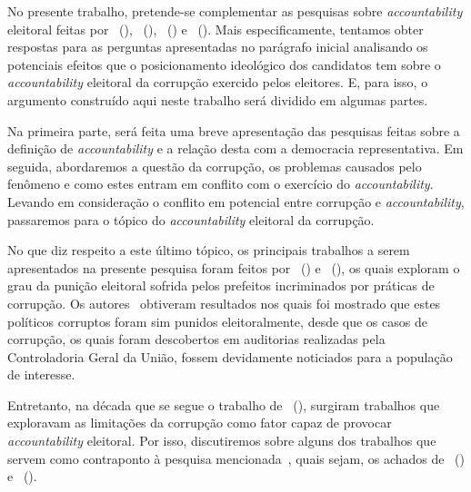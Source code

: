 \documentclass[
	12pt,				%
	openright,			%
	twoside,			%
	a4paper,			%
	openany,
	english,			%
	brazil				%
	]{abntex2}
\begin{document}
No presente trabalho, pretende-se complementar as pesquisas sobre \textit{accountability} eleitoral feitas por ~(\citeyear{ferraz2008exposing}), ~(\citeyear{Avis2018Oct}), ~(\citeyear{Boas2019Apr}) e ~(\citeyear{Botero2021Apr}). Mais especificamente, tentamos obter respostas para as perguntas apresentadas no parágrafo inicial analisando os potenciais efeitos que o posicionamento ideológico dos candidatos tem sobre o \textit{accountability} eleitoral da corrupção exercido pelos eleitores. E, para isso, o argumento construído aqui neste trabalho será dividido em algumas partes.

Na primeira parte, será feita uma breve apresentação das pesquisas feitas sobre a definição de \textit{accountability} e a relação desta com a democracia representativa. Em seguida, abordaremos a questão da corrupção, os problemas causados pelo fenômeno e como estes entram em conflito com o exercício do \textit{accountability}. Levando em consideração o conflito em potencial entre corrupção e \textit{accountability}, passaremos para o tópico do \textit{accountability} eleitoral da corrupção.

No que diz respeito a este último tópico, os principais trabalhos a serem apresentados na presente pesquisa foram feitos por ~(\citeyear{ferraz2008exposing}) e ~(\citeyear{Avis2018Oct}), os quais exploram o grau da punição eleitoral sofrida pelos prefeitos incriminados por práticas de corrupção. Os autores~\cite{ferraz2008exposing, Avis2018Oct} obtiveram resultados nos quais foi mostrado que estes políticos corruptos foram sim punidos eleitoralmente, desde que os casos de corrupção, os quais foram descobertos em auditorias realizadas pela Controladoria Geral da União, fossem devidamente noticiados para a população de interesse.

Entretanto, na década que se segue o trabalho de ~(\citeyear{ferraz2008exposing}), surgiram trabalhos que exploravam as limitações da corrupção como fator capaz de provocar \textit{accountability} eleitoral. Por isso, discutiremos sobre alguns dos trabalhos que servem como contraponto à pesquisa mencionada~\cite{ferraz2008exposing}, quais sejam, os achados de ~(\citeyear{dunning2019voter}) e ~(\citeyear{Pavao2018Jul}).
\end{document}
